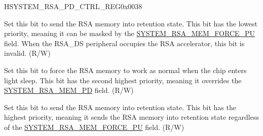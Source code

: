 \begin{register}{H}{SYSTEM\_RSA\_PD\_CTRL\_REG}{0x0038}\label{regdesc:SYSTEMRSAPDCTRLREG}
%
%
%
%
\regnewline%
\begin{regdesc}\begin{reglist}
\label{fielddesc:SYSTEMRSAMEMPD}\item [SYSTEM\_RSA\_MEM\_PD] Set this bit to send the RSA memory into retention state. This bit has the lowest priority, meaning it can be masked by the \hyperref[fielddesc:SYSTEMRSAMEMFORCEPU]{SYSTEM\_RSA\_MEM\_FORCE\_PU} field. When the RSA\_DS peripheral occupies the RSA accelerator, this bit is invalid. (R/W)
\label{fielddesc:SYSTEMRSAMEMFORCEPU}\item [SYSTEM\_RSA\_MEM\_FORCE\_PU] Set this bit to force the RSA memory to work as normal when the chip enters light sleep. This bit has the second highest priority, meaning it overrides the \hyperref[fielddesc:SYSTEMRSAMEMPD]{SYSTEM\_RSA\_MEM\_PD} field. (R/W)
\label{fielddesc:SYSTEMRSAMEMFORCEPD}\item [SYSTEM\_RSA\_MEM\_FORCE\_PD] Set this bit to send the RSA memory into retention state. This bit has the highest priority, meaning it sends the RSA memory into retention state regardless of the \hyperref[fielddesc:SYSTEMRSAMEMFORCEPU]{SYSTEM\_RSA\_MEM\_FORCE\_PU} field. (R/W)
\end{reglist}\end{regdesc}
\end{register}


